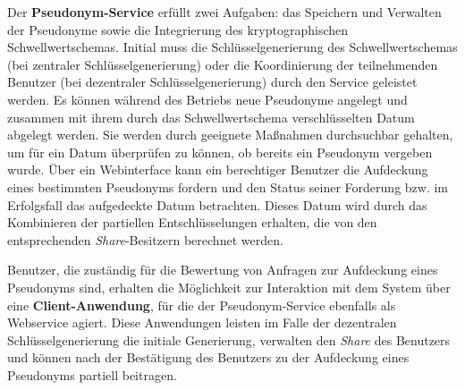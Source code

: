 Der \textbf{Pseudonym-Service} erfüllt zwei Aufgaben: das Speichern und Verwalten der Pseudonyme sowie die Integrierung des kryptographischen Schwellwertschemas. Initial muss die Schlüsselgenerierung des Schwellwertschemas (bei zentraler Schlüsselgenerierung) oder die Koordinierung der teilnehmenden Benutzer (bei dezentraler Schlüsselgenerierung) durch den Service geleistet werden. 
Es können während des Betriebs neue Pseudonyme angelegt und zusammen mit ihrem durch das Schwellwertschema verschlüsselten Datum abgelegt werden. Sie werden durch geeignete Maßnahmen durchsuchbar gehalten, um für ein Datum überprüfen zu können, ob bereits ein Pseudonym vergeben wurde. 
Über ein Webinterface kann ein berechtiger Benutzer die Aufdeckung eines bestimmten Pseudonyms fordern und den Status seiner Forderung bzw. im Erfolgsfall das aufgedeckte Datum betrachten. Dieses Datum wird durch das Kombinieren der partiellen Entschlüsselungen erhalten, die von den entsprechenden \textit{Share}-Besitzern berechnet werden.

Benutzer, die zuständig für die Bewertung von Anfragen zur Aufdeckung eines Pseudonyms sind, erhalten die Möglichkeit zur Interaktion mit dem System über eine \textbf{Client-Anwendung}, für die der Pseudonym-Service ebenfalls als Webservice agiert. Diese Anwendungen leisten im Falle der dezentralen Schlüsselgenerierung die initiale Generierung, verwalten den \textit{Share} des Benutzers und können nach der Bestätigung des Benutzers zu der Aufdeckung eines Pseudonyms partiell beitragen. 
